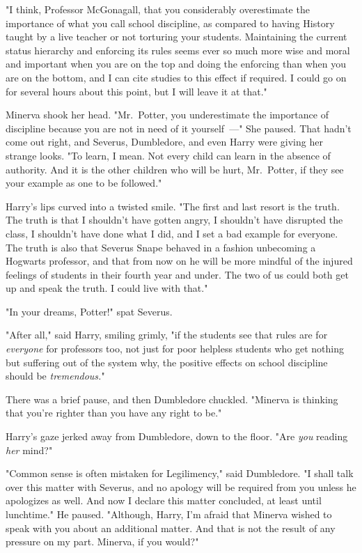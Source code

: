 "I think, Professor McGonagall, that you considerably overestimate the
importance of what you call school discipline, as compared to having History
taught by a live teacher or not torturing your students. Maintaining the
current status hierarchy and enforcing its rules seems ever so much more wise
and moral and important when you are on the top and doing the enforcing than
when you are on the bottom, and I can cite studies to this effect if required.
I could go on for several hours about this point, but I will leave it at that."

Minerva shook her head. "Mr.~Potter, you underestimate the importance of
discipline because you are not in need of it yourself~---" She paused. That
hadn't come out right, and Severus, Dumbledore, and even Harry were giving her
strange looks. "To learn, I mean. Not every child can learn in the absence of
authority. And it is the other children who will be hurt, Mr.~Potter, if they
see your example as one to be followed."

Harry's lips curved into a twisted smile. "The first and last resort is the
truth. The truth is that I shouldn't have gotten angry, I shouldn't have
disrupted the class, I shouldn't have done what I did, and I set a bad example
for everyone. The truth is also that Severus Snape behaved in a fashion
unbecoming a Hogwarts professor, and that from now on he will be more mindful
of the injured feelings of students in their fourth year and under. The two of
us could both get up and speak the truth. I could live with that."

"In your dreams, Potter!" spat Severus.

"After all," said Harry, smiling grimly, "if the students see that rules are
for \emph{everyone{\el}} for professors too, not just for poor helpless
students who get nothing but suffering out of the system{\el} why, the
positive effects on school discipline should be \emph{tremendous.}"

There was a brief pause, and then Dumbledore chuckled. "Minerva is thinking
that you're righter than you have any right to be."

Harry's gaze jerked away from Dumbledore, down to the floor. "Are \emph{you}
reading \emph{her} mind?"

"Common sense is often mistaken for Legilimency," said Dumbledore. "I shall
talk over this matter with Severus, and no apology will be required from you
unless he apologizes as well. And now I declare this matter concluded, at least
until lunchtime." He paused. "Although, Harry, I'm afraid that Minerva wished
to speak with you about an additional matter. And that is not the result of any
pressure on my part. Minerva, if you would?"


